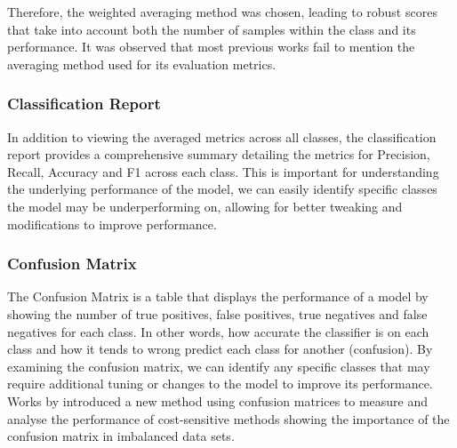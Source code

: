Therefore, the weighted averaging method was chosen, leading to robust scores that take into account both the number of samples within the class and its performance. It was observed that most previous works fail to mention the averaging method used for its evaluation metrics.

\subsubsection*{Classification Report}

In addition to viewing the averaged metrics across all classes, the classification report provides a comprehensive summary detailing the metrics for Precision, Recall, Accuracy and F1 across each class. This is important for understanding the underlying performance of the model, we can easily identify specific classes the model may be underperforming on, allowing for better tweaking and modifications to improve performance.

\subsubsection*{Confusion Matrix}

The Confusion Matrix is a table that displays the performance of a model by showing the number of true positives, false positives, true negatives and false negatives for each class. In other words, how accurate the classifier is on each class and how it tends to wrong predict each class for another (confusion). By examining the confusion matrix, we can identify any specific classes that may require additional tuning or changes to the model to improve its performance. Works by \textcite{pmlr-v29-Koco13} introduced a new method using confusion matrices to measure and analyse the performance of cost-sensitive methods showing the importance of the confusion matrix in imbalanced data sets.
